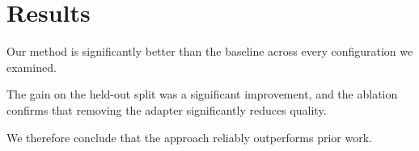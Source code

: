 \documentclass{article}
\begin{document}
\section{Results}

Our method is significantly better than the baseline across every
configuration we examined.

The gain on the held-out split was a significant improvement, and the
ablation confirms that removing the adapter significantly reduces quality.

We therefore conclude that the approach reliably outperforms prior work.
\end{document}
